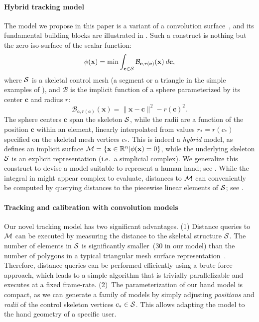 \paragraph{Hybrid tracking model}
The model we propose in this paper is a variant of a convolution surface~\cite{bloomenthal1991convolution}, and its fundamental building blocks are illustrated in . Such a construct is nothing but the zero iso-surface of the scalar function:
\begin{equation}
\phi(\mathbf{x}) = \min \int_{\mathbf{c} \in \mathcal{S}} \mathcal{B}_{\mathbf{c}, r(\mathbf{c})}(\mathbf{x}) \: d\mathbf{c},
\label{eq:convsurf}
\end{equation}
where $\mathcal{S}$ is a skeletal control mesh (a segment or a triangle in the simple examples of ), and $\mathcal{B}$ is the implicit function of a sphere parameterized by its center $\mathbf{c}$ and radius $r$:
\begin{equation}
\mathcal{B}_{\mathbf{c}, r(\mathbf{c})}(\mathbf{x}) = \|\mathbf{x}-\mathbf{c}\|^2 - r(\mathbf{c})^2.
\end{equation}
The sphere centers $\mathbf{c}$ span the skeleton $\mathcal{S}$, while the radii are a function of the position $\mathbf{c}$ within an element, linearly interpolated from values $r_*=r(c_*)$ specified on the skeletal mesh vertices $c_*$. This is indeed a \emph{hybrid} model, as  defines an implicit surface $\mathcal{M} = \{\mathbf{x} \in \mathbb{R}^n | \phi(\mathbf{x})=0 \}$, while the underlying skeleton $\mathcal{S}$ is an explicit representation (i.e.\ a simplicial complex). We generalize this construct to devise a model suitable to represent a human hand; see .
While the integral in  might appear complex to evaluate, distances to $\mathcal{M}$ can conveniently be computed by querying distances to the piecewise linear elements of $\mathcal{S}$; see .


\paragraph{Tracking and calibration with convolution models}
Our novel tracking model has two significant advantages. (1) Distance queries to $\mathcal{M}$ can be executed by measuring the distance to the skeletal structure $\mathcal{S}$. The number of elements in $\mathcal{S}$ is significantly smaller~(30 in our model) than the number of polygons in a typical triangular mesh surface representation~\cite{thiery2013sphere}. 
Therefore, distance queries can be performed efficiently using a brute force approach, which leads to a simple algorithm that is trivially parallelizable and executes at a fixed frame-rate. (2)~The parameterization of our hand model is compact, as we can generate a family of models by simply adjusting \emph{positions} and \emph{radii} of the control skeleton vertices $c_* \in \mathcal{S}$. This allows adapting the model to the hand geometry of a specific user.

